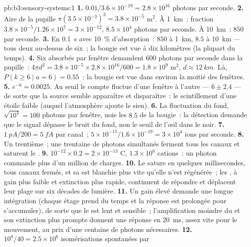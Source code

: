 \begin{solution}{pb:b3:sensory-systems:1}
\textbf{1.} $0.01/3.6\times 10^{-19} = 2.8\times 10^{16}$ photons par
seconde.
\textbf{2.} Aire de la pupille $\pi(3.5\times 10^{-3})^{2} = 3.8\times 10^{-5}$
m$^{2}$. À \qty{1}{km}~: fraction $3.8\times 10^{-5}/1.26\times 10^{7} =
3\times 10^{-12}$, $8.5\times 10^{4}$ photons par seconde. À
\qty{10}{km}~: $850$ par seconde.
\textbf{3.} En \qty{0.1}{s} avec \qty{10}{\%} d'absorption~: $850$ à
\qty{1}{km}, $8.5$ à \qty{10}{km} --- tous deux au-dessus de six~; la
bougie est vue à dix kilomètres (la plupart du temps).
\textbf{4.} Six absorbés par fenêtre demandent $600$ photons par seconde
dans la pupille~: $4\pi d^{2} = 3.8\times 10^{-5}\times 2.8\times 10^{16}/600
= 1.8\times 10^{9}$ m$^{2}$, $d \approx \qty{12}{km}$. Là, $P(k \ge
6 \mid a = 6) = 0.55$~: la bougie est vue dans environ la moitié des
fenêtres.
\textbf{5.} $e^{-6} = 0.0025$. Au seuil le compte fluctue d'une fenêtre
à l'autre --- $6 \pm 2.4$ --- de sorte que la source semble apparaître et
disparaître~: le scintillement d'une étoile faible (auquel l'atmosphère
ajoute le sien).
\textbf{6.} La fluctuation du fond, $\sqrt{10^{4}} = 100$ photons par
fenêtre, noie les $8.5$ de la bougie~: la détection demande que le
signal dépasse le bruit du fond, non le seuil de l'œil dans le noir.
\textbf{7.} $\qty{1}{pA}/200 = \qty{5}{fA}$ par canal~; $5\times
10^{-15}/1.6\times 10^{-19} = 3\times 10^{4}$ ions par seconde.
\textbf{8.} Un trentième~; une trentaine de photons simultanés ferment
tous les canaux et saturent le .
\textbf{9.} $10^{-12}\times 0.2 = 2\times 10^{-13}$ C, $1.3\times 10^{6}$
cations~: un photon commande plus d'un million de charges.
\textbf{10.} Le  sature en quelques millisecondes, tous canaux
fermés, et sa  est blanchie plus vite qu'elle n'est
régénérée~; les , à gain plus faible et extinction plus rapide,
continuent de répondre et déplacent leur plage sur six décades de
lumière.
\textbf{11.} Un gain élevé demande une longue intégration (chaque étage
prend du temps et la réponse est prolongée pour s'accumuler), de sorte
que le  est lent et sensible~; l'amplification moindre du 
et son extinction plus prompte donnent une réponse en \qty{20}{ms},
assez vite pour le mouvement, au prix d'une centaine de photons
nécessaires.
\textbf{12.} $10^{8}/40 = 2.5\times 10^{6}$ isomérisations spontanées par

\end{solution}
